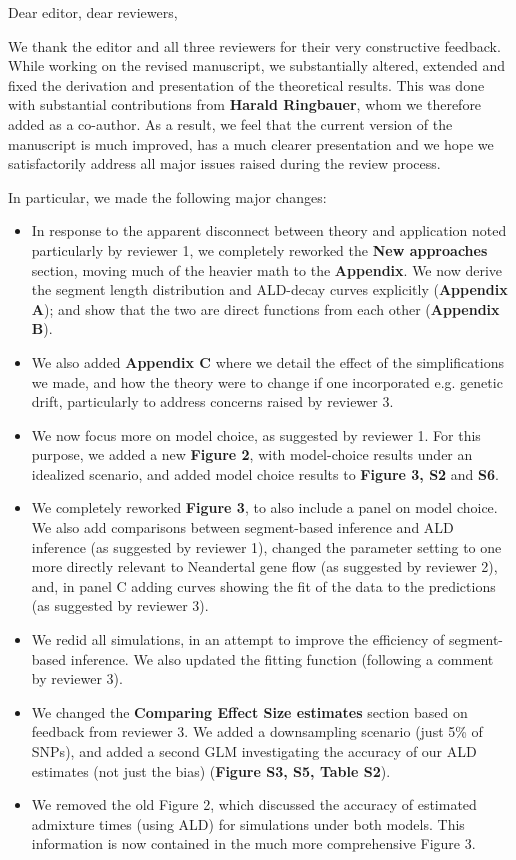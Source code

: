 \documentclass[11pt]{article}
\begin{document}
Dear editor, dear reviewers,

We thank the editor and all three reviewers for their very constructive feedback. While working on the revised manuscript, we substantially altered, extended and fixed the derivation and presentation of the theoretical results. This was done with substantial contributions from \textbf{Harald Ringbauer}, whom we therefore added as a co-author. As a result, we feel that the current version of the manuscript is much improved, has a much clearer presentation and  we hope we satisfactorily address all major issues raised during the review process.

In particular, we made the following major changes:
\begin{itemize}
    \item In response to the apparent disconnect between theory and application noted particularly by reviewer 1, we completely reworked the \textbf{New approaches} section, moving much of the heavier math to the \textbf{Appendix}. We now derive the segment length distribution and ALD-decay curves explicitly (\textbf{Appendix A}); and show that the two are direct functions from each other (\textbf{Appendix B}).
    \item We also added \textbf{Appendix C} where we detail the effect of the simplifications we made, and how the theory were to change if one incorporated e.g. genetic drift, particularly to address concerns raised by reviewer 3.
    \item We now focus more on model choice, as suggested by reviewer 1. For this purpose, we added a new \textbf{Figure 2}, with model-choice results under an idealized scenario, and added model choice results to \textbf{Figure 3, S2} and  \textbf{S6}.
    \item We completely reworked \textbf{Figure 3}, to also include a panel on model choice. We also add comparisons between segment-based inference and ALD inference (as suggested by reviewer 1), changed the parameter setting to one more directly relevant to Neandertal gene flow (as suggested by reviewer 2), and, in panel C adding curves showing the fit of the data to the predictions (as suggested by reviewer 3).
    \item We redid all simulations, in an attempt to improve the efficiency of segment-based inference. We also updated the fitting function (following a comment by reviewer 3).
    \item We changed the \textbf{Comparing Effect Size estimates} section based on feedback from reviewer 3. We added a downsampling scenario (just 5\% of SNPs), and added a second GLM investigating the accuracy of our ALD estimates (not just the bias) (\textbf{Figure S3, S5, Table S2}).
    \item We removed the old Figure 2, which discussed the accuracy of estimated admixture times (using ALD) for simulations under both models. This information is now contained in the much more comprehensive Figure 3. 
\end{itemize}
\end{document}

